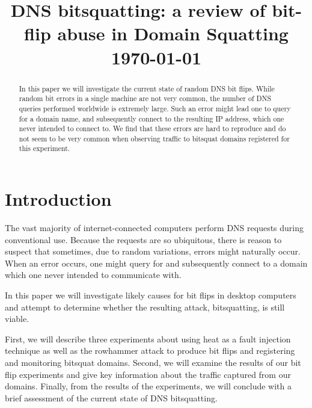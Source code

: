 \documentclass[conference]{IEEEtran}
\begin{document}
\title{DNS bitsquatting: a review of bit-flip abuse in Domain Squatting\\\vspace{5mm} \large  \today}
\author{
\and
{}
}
\maketitle
\thispagestyle{plain}
\pagestyle{plain}

\begin{abstract}

	In this paper we will investigate the current state of random DNS bit
	flips. While random bit errors in a single machine are not very common, the
	number of DNS queries performed worldwide is extremely large. Such an error
	might lead one to query for a domain name, and subsequently connect to the
	resulting IP address, which one never intended to connect to. We find that
	these errors are hard to reproduce and do not seem to be very common when
	observing traffic to bitsquat domains registered for this experiment.

\end{abstract}

\section{Introduction}

The vast majority of internet-connected computers perform DNS requests during
conventional use. Because the requests are so ubiquitous, there is reason to
suspect that sometimes, due to random variations, errors might naturally occur.
When an error occurs, one might query for and subsequently connect to a domain
which one never intended to communicate with.

In this paper we will investigate likely causes for bit flips in desktop
computers and attempt to determine whether the resulting attack, bitsquatting,
is still viable.

First, we will describe three experiments about using heat as a fault injection
technique as well as the rowhammer attack to produce bit flips and registering
and monitoring bitsquat domains. Second, we will examine the results of our bit
flip experiments and give key information about the traffic captured from our
domains. Finally, from the results of the experiments, we will conclude with a
brief assessment of the current state of DNS bitsquatting.
\end{document}
